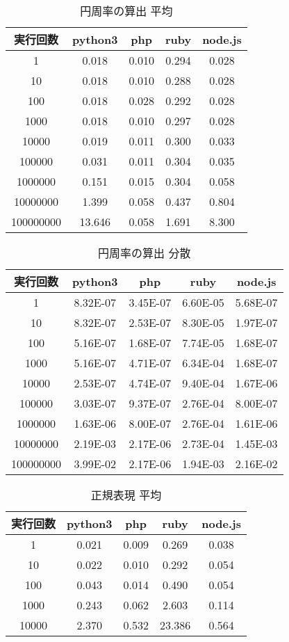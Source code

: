 \begin{table}[tb]
\centering
\begin{tabular}{|c||c|c|c|c|}
\hline
実行回数	&python3	&php	&ruby	&node.js\\ \hline
1	&0.018	&0.010	&0.294	&0.028\\ \hline
10	&0.018	&0.010	&0.288	&0.028\\ \hline
100	&0.018	&0.028	&0.292	&0.028\\ \hline
1000	&0.018	&0.010	&0.297	&0.028\\ \hline
10000	&0.019	&0.011	&0.300	&0.033\\ \hline
100000	&0.031	&0.011	&0.304	&0.035\\ \hline
1000000	&0.151	&0.015	&0.304	&0.058\\ \hline
10000000	&1.399	&0.058	&0.437	&0.804\\ \hline
100000000	&13.646	&0.058	&1.691	&8.300\\ \hline
\end{tabular}
\caption{円周率の算出 平均}
\label{table:p-average}
\end{table}

\begin{table}[tb]
\centering
\begin{tabular}{|c||c|c|c|c|}
\hline
実行回数	&python3	&php	&ruby	&node.js\\ \hline
1		&8.32E-07	&3.45E-07	&6.60E-05	&5.68E-07\\ \hline
10		&8.32E-07	&2.53E-07	&8.30E-05	&1.97E-07\\ \hline
100		&5.16E-07	&1.68E-07	&7.74E-05	&1.68E-07\\ \hline
1000		&5.16E-07	&4.71E-07	&6.34E-04	&1.68E-07\\ \hline
10000		&2.53E-07	&4.74E-07	&9.40E-04	&1.67E-06\\ \hline
100000		&3.03E-07	&9.37E-07	&2.76E-04	&8.00E-07\\ \hline
1000000		&1.63E-06	&8.00E-07	&2.76E-04	&1.61E-06\\ \hline
10000000	&2.19E-03	&2.17E-06	&2.73E-04	&1.45E-03\\ \hline
100000000	&3.99E-02	&2.17E-06	&1.94E-03	&2.16E-02\\ \hline

\end{tabular}
\caption{円周率の算出 分散}
\label{table:p-dispersion}
\end{table}

\begin{table}[tb]
\centering
\begin{tabular}{|c||c|c|c|c|}
\hline
実行回数	&python3	&php	&ruby	&node.js\\ \hline
1	&0.021	&0.009	&0.269	&0.038\\ \hline
10	&0.022	&0.010	&0.292	&0.054\\ \hline
100	&0.043	&0.014	&0.490	&0.054\\ \hline
1000	&0.243	&0.062	&2.603	&0.114\\ \hline
10000	&2.370	&0.532	&23.386	&0.564\\ \hline

\end{tabular}
\caption{正規表現 平均}
\label{table:s-average}
\end{table}

